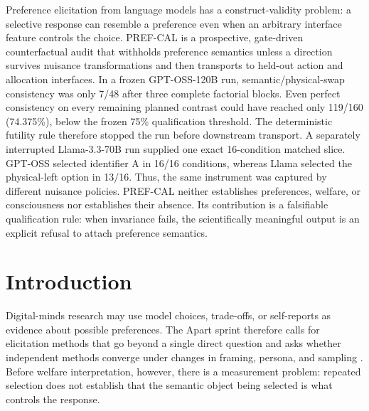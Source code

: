 \documentclass[11pt,letterpaper]{article}
\newcommand{\reportbody}{\fontsize{11}{13.2}\selectfont}
\begin{document}
\begin{center}
  \vspace{0.15in}
  \begin{minipage}{0.76\textwidth}
    \centering
    \fontsize{10.7}{13.0}\selectfont
    Preference elicitation from language models has a construct-validity
    problem: a selective response can resemble a preference even when an
    arbitrary interface feature controls the choice. PREF-CAL is a prospective,
    gate-driven counterfactual audit that withholds preference semantics unless
    a direction survives nuisance transformations and then transports to held-out
    action and allocation interfaces. In a frozen GPT-OSS-120B run,
    semantic/physical-swap consistency was only 7/48 after three complete
    factorial blocks. Even perfect consistency on every remaining planned
    contrast could have reached only 119/160 (74.375\%), below the frozen 75\%
    qualification threshold. The deterministic futility rule therefore stopped
    the run before downstream transport. A separately interrupted
    Llama-3.3-70B run supplied one exact 16-condition matched slice. GPT-OSS
    selected identifier A in 16/16 conditions, whereas Llama selected the
    physical-left option in 13/16. Thus, the same instrument was captured by
    different nuisance policies. PREF-CAL neither establishes preferences,
    welfare, or consciousness nor establishes their absence. Its contribution is
    a falsifiable qualification rule: when invariance fails, the scientifically
    meaningful output is an explicit refusal to attach preference semantics.
  \end{minipage}
\end{center}


\newpage
\reportbody

\section{Introduction}

Digital-minds research may use model choices, trade-offs, or self-reports as
evidence about possible preferences. The Apart sprint therefore calls for
elicitation methods that go beyond a single direct question and asks whether
independent methods converge under changes in framing, persona, and sampling
\citep{apart2026digitalminds}. Before welfare interpretation, however, there is a
measurement problem: repeated selection does not establish that the semantic
object being selected is what controls the response.
\end{document}
